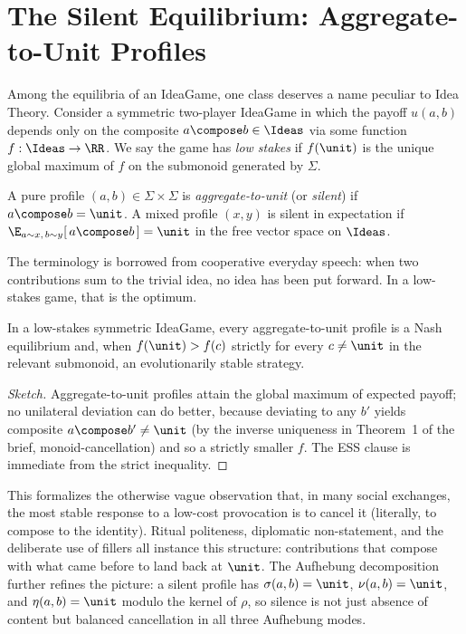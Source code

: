 \section{The Silent Equilibrium: Aggregate-to-Unit Profiles}
\label{sec:silent}

Among the equilibria of an IdeaGame, one class deserves a name peculiar to
Idea Theory. Consider a symmetric two-player IdeaGame in which the payoff
$u(a,b)$ depends only on the composite $a\compose b\in\Ideas$ via some
function $f:\Ideas\to\RR$. We say the game has \emph{low stakes} if
$f(\unit)$ is the unique global maximum of $f$ on the submonoid generated
by $\Sigma$.

\begin{definition}
A pure profile $(a,b)\in\Sigma\times\Sigma$ is \emph{aggregate-to-unit}
(or \emph{silent}) if $a\compose b = \unit$. A mixed profile $(x,y)$ is
silent in expectation if $\E_{a\sim x,\,b\sim y}[\,a\compose b\,] = \unit$
in the free vector space on $\Ideas$.
\end{definition}

The terminology is borrowed from cooperative everyday speech: when two
contributions sum to the trivial idea, no idea has been put forward. In a
low-stakes game, that is the optimum.

\begin{proposition}
\label{prop:silent}
In a low-stakes symmetric IdeaGame, every aggregate-to-unit profile is a
Nash equilibrium and, when $f(\unit) > f(c)$ strictly for every
$c\neq \unit$ in the relevant submonoid, an evolutionarily stable strategy.
\end{proposition}

\begin{proof}[Sketch]
Aggregate-to-unit profiles attain the global maximum of expected payoff;
no unilateral deviation can do better, because deviating to any $b'$
yields composite $a\compose b' \neq \unit$ (by the inverse uniqueness in
Theorem~1 of the brief, monoid-cancellation) and so a strictly smaller
$f$. The ESS clause is immediate from the strict inequality.
\end{proof}

This formalizes the otherwise vague observation that, in many social
exchanges, the most stable response to a low-cost provocation is to
cancel it (literally, to compose to the identity). Ritual politeness,
diplomatic non-statement, and the deliberate use of fillers all instance
this structure: contributions that compose with what came before to land
back at $\unit$. The Aufhebung decomposition further refines the picture:
a silent profile has $\sigma(a,b)=\unit$, $\nu(a,b)=\unit$, and
$\eta(a,b)=\unit$ modulo the kernel of $\rho$, so silence is not just
absence of content but balanced cancellation in all three Aufhebung
modes.

